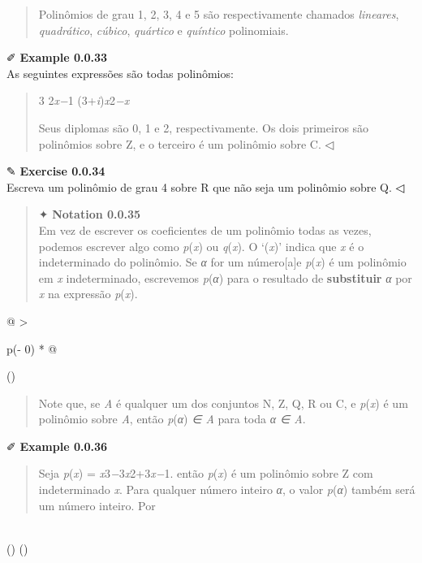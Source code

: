 \documentclass[
]{article}
\begin{document}
\begin{quote}
Polinômios de grau 1, 2, 3, 4 e 5 são respectivamente chamados
\emph{lineares}, \emph{quadrático}, \emph{cúbico}, \emph{quártico} e
\emph{quíntico} polinomiais.
\end{quote}

✐ \textbf{Example 0.0.33}\\
As seguintes expressões são todas polinômios:

\begin{quote}
3 2\emph{x−}1 (3+\emph{i})\emph{x}2\emph{−x}

Seus diplomas são 0, 1 e 2, respectivamente. Os dois primeiros são
polinômios sobre Z, e o terceiro é um polinômio sobre C. ◁
\end{quote}

✎ \textbf{Exercise 0.0.34}\\
Escreva um polinômio de grau 4 sobre R que não seja um polinômio sobre
Q. ◁

\begin{quote}
✦ \textbf{Notation 0.0.35}\\
Em vez de escrever os coeficientes de um polinômio todas as vezes,
podemos escrever algo como \emph{p}(\emph{x}) ou \emph{q}(\emph{x}). O
`(\emph{x})' indica que \emph{x} é o indeterminado do polinômio. Se
\emph{α} for um número{[}a{]}e \emph{p}(\emph{x}) é um polinômio em
\emph{x} indeterminado, escrevemos \emph{p}(\emph{α}) para o resultado
de \textbf{substituir} \emph{α} por \emph{x} na expressão
\emph{p}(\emph{x}).
\end{quote}

\begin{longtable}[]{@{}
  >{\raggedright\arraybackslash}p{(\columnwidth - 0\tabcolsep) * }@{}}
\toprule()
\begin{minipage}[b]{\linewidth}\raggedright
\begin{quote}
Note que, se \emph{A} é qualquer um dos conjuntos N, Z, Q, R ou C, e
\emph{p}(\emph{x}) é um polinômio sobre \emph{A}, então
\emph{p}(\emph{α}) \emph{∈ A} para toda \emph{α ∈ A}.
\end{quote}

✐ \textbf{Example 0.0.36}

\begin{quote}
Seja \emph{p}(\emph{x}) = \emph{x}3\emph{−}3\emph{x}2+3\emph{x−}1. então
\emph{p}(\emph{x}) é um polinômio sobre Z com indeterminado \emph{x}.
Para qualquer número inteiro \emph{α}, o valor \emph{p}(\emph{α}) também
será um número inteiro. Por
\end{quote}
\end{minipage} \\
\midrule()
\endhead
\bottomrule()
\end{longtable}
\end{document}

